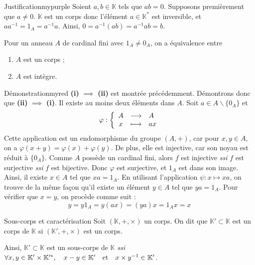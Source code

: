     \begin{demo}{Justification}{mypurple}
        Soient $a,b \in \mathbb{K}$ tels que $ab = 0$. Supposons premièrement que $a \neq 0$. $\mathbb{K}$ est un corps donc l’élément $a \in \mathbb{K}^*$ est inversible, et $a a^{-1} = 1_A = a^{-1} a$. Ainsi, $0 = a^{-1} (ab) = a^{-1} a b = b$. 
    \end{demo}

    \begin{theo}{}{}
        Pour un anneau $A$ de cardinal fini avec $1_A \neq 0_A$, on a équivalence entre
        \begin{enumerate}
            \item $A$ est un corps ;
            \item $A$ est intègre.
        \end{enumerate}
    \end{theo}

    \begin{demo}{Démonstration}{myred}
        \textbf{(i)} $\implies$ \textbf{(ii)} est montrée précédemment. Démontrons donc que \textbf{(ii)} $\implies$ \textbf{(i)}. Il existe au moins deux éléments dans $A$. Soit $a \in A \backslash \{ 0_A \}$ et
        \[ \fonction{\varphi}{A}{A}{x}{ax} \]   
        Cette application est un endomorphisme du groupe $(A,+)$, car pour $x,y \in A$, on a $\varphi(x+y) = \varphi(x) + \varphi(y)$. De plus, elle est injective, car son noyau est réduit à $\{0_A\}$. Comme $A$ possède un cardinal fini, alors $f$ est injective \textit{ssi} $f$ est surjective \textit{ssi} $f$ est bijective. Donc $\varphi$ est surjective, et $1_A$ est dans son image. Ainsi, il existe $x \in A$ tel que $xa = 1_A$. En utilisant l’application $\psi : x \mapsto xa$, on trouve de la même façon qu’il existe un élément $y \in A$ tel que $ya = 1_A$. Pour vérifier que $x = y$, on procède comme suit :
        \[ y = y 1_A = y(ax) = (ya) x = 1_A x = x \]
    \end{demo}

    \begin{defitheo}{Sous-corps et caractérisation}
        Soit $(\mathbb{K}, + , \times)$ un corps. On dit que $\mathbb{K}' \subset \mathbb{K}$ est un corps de $\mathbb{K}$ si $(\mathbb{K}', +, \times)$ est un corps.

        Ainsi, $\mathbb{K}' \subset \mathbb{K}$ est un sous-corps de $\mathbb{K}$ \textit{ssi} $\forall x,y \in \mathbb{K}' \times \mathbb{K}'^*, \quad x-y \in \mathbb{K}' \quad \text{et} \quad x \times y^{-1} \in \mathbb{K}'$.
    \end{defitheo}

